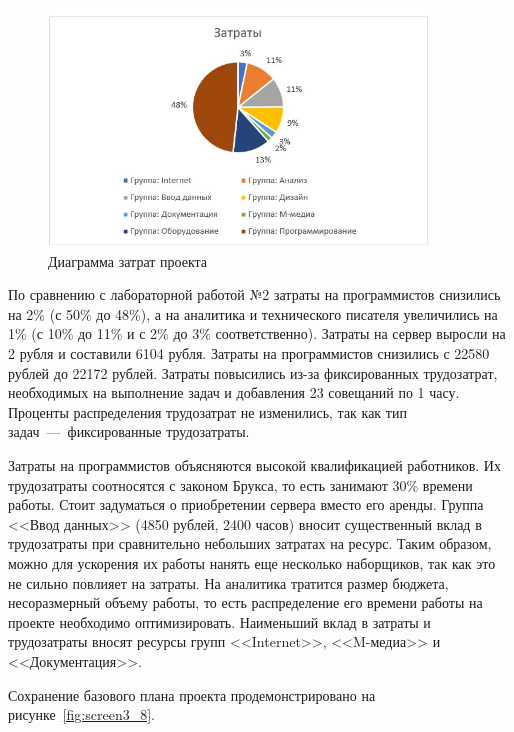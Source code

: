 \begin{figure}[H]
	\centering
	\includegraphics[width=0.9\textwidth]{img/lab3/task3/screen6.jpg}
	\caption{Диаграмма затрат проекта}
	\label{fig:screen3_6}
\end{figure}

По сравнению с лабораторной работой №2 затраты на программистов снизились на 2\% (с 50\% до 48\%), а на аналитика и технического писателя увеличились на 1\% (с 10\% до 11\% и с 2\% до 3\% соответственно).
Затраты на сервер выросли на 2 рубля и составили 6104 рубля.
Затраты на программистов снизились с 22580 рублей до 22172 рублей.
Затраты повысились из-за фиксированных трудозатрат, необходимых на выполнение задач и добавления 23 совещаний по 1 часу.
Проценты распределения трудозатрат не изменились, так как тип задач~---~фиксированные трудозатраты.

Затраты на программистов объясняются высокой квалификацией работников.
Их трудозатраты соотносятся с законом Брукса, то есть занимают 30\% времени работы.
Стоит задуматься о приобретении сервера вместо его аренды.
Группа <<Ввод данных>> (4850 рублей, 2400 часов) вносит существенный вклад в трудозатраты при сравнительно небольших затратах на ресурс.
Таким образом, можно для ускорения их работы нанять еще несколько наборщиков, так как это не сильно повлияет на затраты.
На аналитика тратится размер бюджета, несоразмерный объему работы, то есть распределение его времени работы на проекте необходимо оптимизировать.
Наименьший вклад в затраты и трудозатраты вносят ресурсы групп <<Internet>>, <<M-медиа>> и <<Документация>>.

Сохранение базового плана проекта продемонстрировано на рисунке~\ref{fig:screen3_8}.

